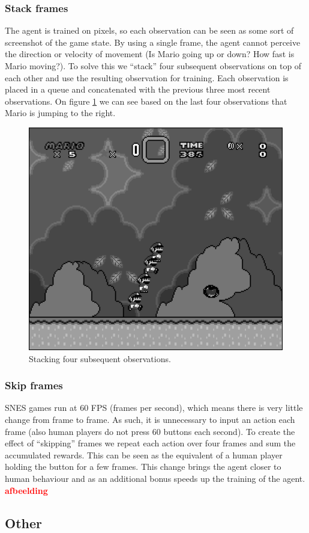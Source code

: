 \documentclass[11pt,a4paper]{article}
\begin{document}
\subsubsection{Stack frames}
The agent is trained on pixels, so each observation can be seen as some sort of screenshot of the game state.
By using a single frame, the agent cannot perceive the direction or velocity of movement (Is Mario going up or down? How fast is Mario moving?).
To solve this we ``stack'' four subsequent observations on top of each other and use the resulting observation for training.
Each observation is placed in a queue and concatenated with the previous three most recent observations.
On figure \ref{fig:stack} we can see based on the last four observations that Mario is jumping to the right.
\begin{figure}[htbp]
    \centering
    \includegraphics[width=.6\textwidth]{stacked}
    \caption{Stacking four subsequent observations.}
    \label{fig:stack}
\end{figure}

\subsubsection{Skip frames}
SNES games run at 60 FPS (frames per second), which means there is very little change from frame to frame.
As such, it is unnecessary to input an action each frame (also human players do not press 60 buttons each second).
To create the effect of ``skipping'' frames we repeat each action over four frames and sum the accumulated rewards.
This can be seen as the equivalent of a human player holding the button for a few frames.
This change brings the agent closer to human behaviour and as an additional bonus speeds up the training of the agent.
\textbf{\textcolor{red}{afbeelding}}

\subsection{Other}
\end{document}
